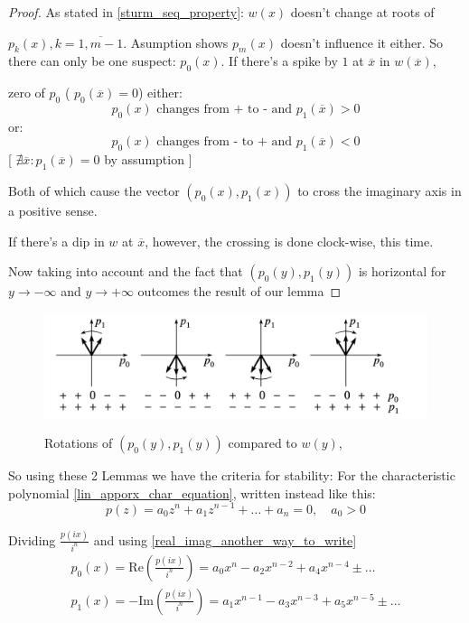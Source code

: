 \begin{proof}

As stated in \ref{sturm_seq_property}: $w(x)$ doesn't change at roots of

$p_k(x), k = \overline{1,m-1}$. Asumption  shows $p_m(x)$
doesn't influence it either. So there can only be one suspect:
$p_0(x)$. If there's a spike by $1$ at $\overline{x}$ in $w(\overline{x})$,

zero of $p_0$
(   $p_0(\overline{x}) =0 $) either:
\[
	p_0(x) \text{ changes from + to - and   } p_1(\overline{x}) > 0
\]
or:
\[
	p_0(x) \text{ changes from - to + and  } p_1(\overline{x}) < 0
\]
[   $\nexists \overline{x}: p_1(\overline{x}) = 0$ by assumption   ]

Both of which cause the vector $(p_0(x), p_1(x))$ to cross the
imaginary axis in a positive sense.

If there's a dip in $w$ at $\overline{x}$, however, the crossing is
done clock-wise, this time.

Now taking  into account and the fact that $(p_0(y), p_1(y))$
is horizontal for $y \rightarrow  - \infty$ and $y \rightarrow +
\infty  $ outcomes the result of our lemma
\end{proof}

\begin{figure}[H]
\includegraphics[width=13cm]{math_pics/sageti-cumse-invart.png}
\centering
\label{fig:vector-ploly-rotations}
\caption{Rotations of $(p_0(y), p_1(y))$ compared to $w(y)$, \cite{hairer1993Nonstiff}}
\end{figure}

So using these 2 Lemmas we have the criteria for stability:
For the characteristic polynomial \ref{lin_apporx_char_equation},
written instead like this:
\[
p(z)=a_0 z^n + a_1z^{n-1} + \dots + a_n = 0, \quad a_0 > 0
\]

Dividing $\frac{p(i x)}{i^n}$ and using \ref{real_imag_another_way_to_write}
\begin{gather}
p_0(x)= \text{Re}(\frac{p(i x)}{i^n}) = a_0 x^{n} -a_2 x^{n-2} + a_4
x^{n-4} \pm \dots \\
p_1(x)= -\text{Im} (\frac{p(i x)}{i^n}) = a_1 x^{n-1} -a_3 x^{n-3} +
a_5 x^{n-5} \pm \dots
\end{gather}


